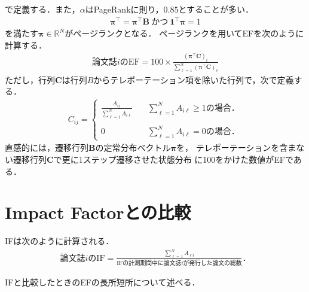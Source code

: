 で定義する．また，$\alpha$はPageRankに則り，$0.85$とすることが多い．
\begin{align*}
    \bm{\pi}^{\top} = \bm{\pi}^{\top}\bm{B}~\text{かつ}~ \bm{1}^{\top}\bm{\pi}=1
\end{align*}
を満たす$\bm{\pi} \in \mathbb{R}^N$がページランクとなる．
ページランクを用いてEFを次のように計算する．
\begin{align*}
    \text{論文誌$i$のEF} = 100 \times \frac{( \bm{\pi}^{\top} \bm{C} )_i}{\sum_{\ell=1}^N ( \bm{\pi}^{\top} \bm{C} )_{\ell}}
\end{align*}
ただし，行列$\bm{C}$は行列$B$からテレポーテーション項を除いた行列で，次で定義する\cite{Masuda2013}．
\begin{align*}
    C_{ij} =
    \begin{cases}
        \frac{A_{ij}}{\sum_{\ell=1}^N A_{i\ell}}
         & \quad \sum_{\ell=1}^N A_{i\ell} \geq 1\text{の場合．} \\
        \\
        0
         & \quad \sum_{\ell=1}^N A_{i\ell} =0\text{の場合．}
    \end{cases}
\end{align*}
直感的には，遷移行列$\bm{B}$の定常分布ベクトル$\bm{\pi}$を，
テレポーテーションを含まない遷移行列$\bm{C}$で更に1ステップ遷移させた状態分布
に100をかけた数値がEFである．


\section{Impact Factorとの比較}
IFは次のように計算される．
\begin{align*}
    \text{論文誌$i$のIF}
    = \frac{\sum_{\ell=1}^N A_{\ell i}}{\text{IFの計測期間中に論文誌$i$が発行した論文の総数}}．
\end{align*}

IFと比較したときのEFの長所短所について述べる．

